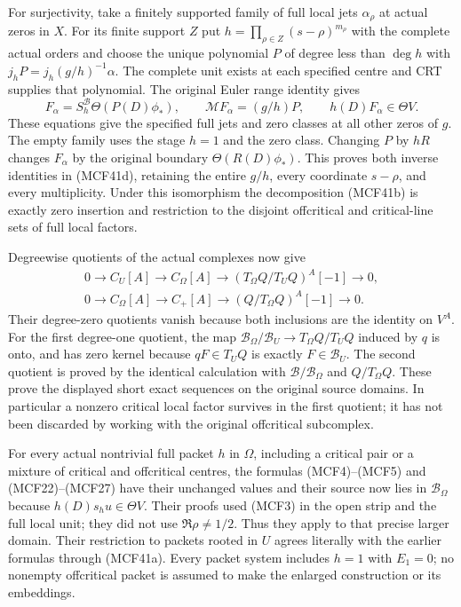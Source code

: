 \documentclass[11pt,a4paper]{article}
\begin{document}
For surjectivity, take a finitely supported family of full local jets
$\alpha_\rho$ at actual zeros in $X$.  For its finite support $Z$ put
$h=\prod_{\rho\in Z}(s-\rho)^{m_\rho}$ with the complete actual
orders and choose the unique polynomial $P$ of degree less than
$\deg h$ with
$j_hP=j_h(g/h)^{-1}\alpha$.  The complete unit exists at each
specified centre and CRT supplies that polynomial.  The original
Euler range identity gives
\[
F_\alpha=S_h^{\mathscr B}\Theta(P(D)\phi_*),\qquad
\mathcal MF_\alpha=(g/h)P,\qquad h(D)F_\alpha\in\Theta V.
\tag{MCF41e}
\]
These equations give the specified full jets and zero classes at all
other zeros of $g$.  The empty family uses the stage $h=1$ and the
zero class.  Changing $P$ by $hR$ changes $F_\alpha$ by the original
boundary $\Theta(R(D)\phi_*)$.  This proves both inverse identities
in (MCF41d), retaining the entire $g/h$, every coordinate $s-\rho$,
and every multiplicity.  Under this isomorphism the decomposition
(MCF41b) is exactly zero insertion and restriction to the disjoint
offcritical and critical-line sets of full local factors.

Degreewise quotients of the actual complexes now give
\[
\begin{gathered}
0\longrightarrow C_U[A]\longrightarrow C_\Omega[A]
\longrightarrow (T_\Omega Q/T_UQ)^A[-1]\longrightarrow0,\\
0\longrightarrow C_\Omega[A]\longrightarrow C_+[A]
\longrightarrow (Q/T_\Omega Q)^A[-1]\longrightarrow0.
\end{gathered}
\tag{MCF41f}
\]
Their degree-zero quotients vanish because both inclusions are the
identity on $V^A$.  For the first degree-one quotient, the map
$\mathscr B_\Omega/\mathscr B_U\to T_\Omega Q/T_UQ$ induced by $q$
is onto, and has zero kernel because $qF\in T_UQ$ is exactly
$F\in\mathscr B_U$.  The second quotient is proved by the identical
calculation with $\mathscr B/\mathscr B_\Omega$ and $Q/T_\Omega Q$.
These prove the displayed short exact sequences on the original
source domains.  In particular a nonzero critical local factor
survives in the first quotient; it has not been discarded by working
with the original offcritical subcomplex.

For every actual nontrivial full packet $h$ in $\Omega$, including a
critical pair or a mixture of critical and offcritical centres,
the formulas (MCF4)--(MCF5) and (MCF22)--(MCF27) have their unchanged
values and their source now lies in $\mathscr B_\Omega$ because
$h(D)s_hu\in\Theta V$.  Their proofs used (MCF3) in the open strip
and the full local unit; they did not use $\Re\rho\ne1/2$.
Thus they apply to that precise larger domain.  Their restriction
to packets rooted in $U$ agrees literally with the earlier formulas
through (MCF41a).  Every packet system includes $h=1$ with $E_1=0$;
no nonempty offcritical packet is assumed to make the enlarged
construction or its embeddings.
\end{document}
